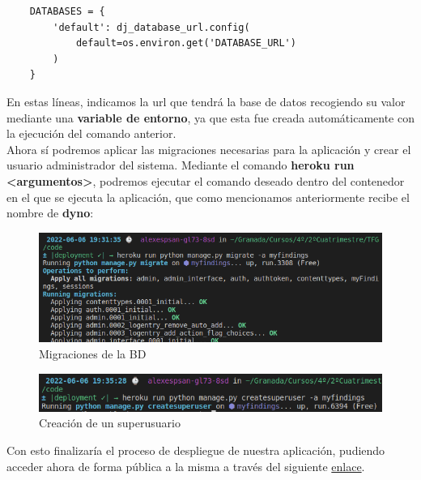 \begin{verbatim}
    DATABASES = {
        'default': dj_database_url.config(
            default=os.environ.get('DATABASE_URL')
        )
    }
\end{verbatim}

En estas líneas, indicamos la url que tendrá la base de datos recogiendo su valor mediante
una \textbf{variable de entorno}, ya que esta fue creada automáticamente con la ejecución
del comando anterior.\\

Ahora sí podremos aplicar las migraciones necesarias para la aplicación y crear el
usuario administrador del sistema. Mediante el comando \textbf{heroku run <argumentos>},
podremos ejecutar el comando deseado dentro del contenedor en el que se ejecuta la
aplicación, que como mencionamos anteriormente recibe el nombre de \textbf{dyno}:

    \begin{figure}[H]
        \centering
        \includegraphics[scale=0.50]{imagenes/heroku-migrate.png}
        \caption{Migraciones de la BD}
        \label{fig:heroku-migrate}
    \end{figure}

    \begin{figure}[H]
        \centering
        \includegraphics[scale=0.55]{imagenes/heroku-createsuperuser.png}
        \caption{Creación de un superusuario}
        \label{fig:heroku-createsuperuser}
    \end{figure}

Con esto finalizaría el proceso de despliegue de nuestra aplicación, pudiendo acceder
ahora de forma pública a la misma a través del siguiente
\href{https://myfindings.herokuapp.com/}{enlace}.
